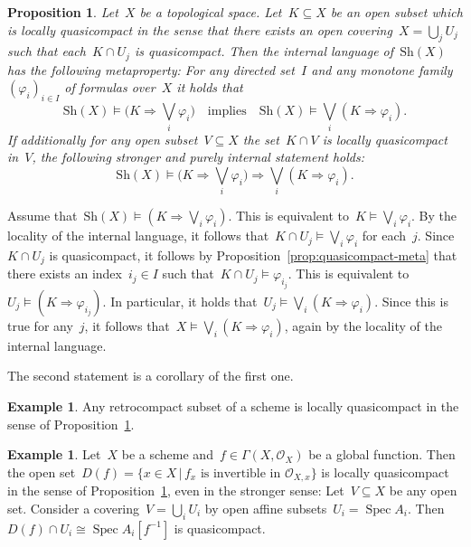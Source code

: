 \documentclass[10pt,reqno,a4paper]{amsbook}
\makeatletter
\theoremstyle{definition}
\newtheorem{ex}[defn]{Example}
\theoremstyle{plain}
\newtheorem{prop}[defn]{Proposition}
\theoremstyle{remark}
\renewcommand{\O}{\mathcal{O}}
\newcommand{\Sh}{\mathrm{Sh}}
\DeclareMathOperator{\Spec}{Spec}
\newcommand{\?}{\,{:}\,}
\renewcommand{\_}{\mathpunct{.}\,}
\renewenvironment{proof}[1][\proofname]{\par
  \pushQED{\qed}%
  \normalfont \topsep6\p@\@plus6\p@\relax
  \trivlist
  \item[\hskip\labelsep
        \itshape
    #1\@addpunct{.}]\ignorespaces
}{%
  \popQED\endtrivlist\@endpefalse
}
\makeatother
\begin{document}
\begin{prop}\label{prop:locally-qc}
Let~$X$ be a topological space. Let~$K \subseteq X$ be an open
subset which is \emph{locally quasicompact} in the sense that there exists an open
covering~$X = \bigcup_j U_j$ such that each~$K \cap U_j$ is quasicompact. Then the
internal language of~$\Sh(X)$ has the following metaproperty: For any
directed set~$I$ and any monotone family~$(\varphi_i)_{i \in I}$ of formulas
over~$X$ it holds that
\[ \Sh(X) \models \bigl(K \Rightarrow \bigvee_i \varphi_i\bigr)
  \quad\text{implies}\quad
  \Sh(X) \models \bigvee_i (K \Rightarrow \varphi_i). \]
If additionally for any open subset~$V \subseteq X$ the set~$K \cap V$ is
locally quasicompact in~$V\!$, the following stronger and purely internal
statement holds:
\[ \Sh(X) \models \bigl(K \Rightarrow \bigvee_i \varphi_i\bigr)
  \Longrightarrow
  \bigvee_i (K \Rightarrow \varphi_i). \]
\end{prop}
\begin{proof}Assume that~$\Sh(X) \models (K \Rightarrow \bigvee_i \varphi_i)$.
This is equivalent to~$K \models \bigvee_i \varphi_i$. By the locality of the
internal language, it follows that~$K \cap U_j \models \bigvee_i \varphi_i$ for each~$j$.
Since~$K \cap U_j$ is quasicompact, it follows by Proposition~\ref{prop:quasicompact-meta} that
there exists an index~$i_j \in I$ such that~$K \cap U_j \models \varphi_{i_j}$.
This is equivalent to~$U_j \models (K \Rightarrow \varphi_{i_j})$. In
particular, it holds that~$U_j \models \bigvee_i (K \Rightarrow \varphi_i)$.
Since this is true for any~$j$, it follows that~$X \models \bigvee_i (K
\Rightarrow \varphi_i)$, again by the locality of the internal language.

The second statement is a corollary of the first one.
\end{proof}

\begin{ex}Any retrocompact subset of a scheme is locally quasicompact in the
sense of Proposition~\ref{prop:locally-qc}.\end{ex}

\begin{ex}\label{ex:df-locally-compact}
Let~$X$ be a scheme and~$f \in \Gamma(X,\O_X)$ be a global function.
Then the open set~$D(f) = \{ x \in X \,|\, \text{$f_x$ is invertible in~$\O_{X,x}$}
\}$ is locally quasicompact in the sense of Proposition~\ref{prop:locally-qc}, even in the
stronger sense: Let~$V \subseteq X$ be any open set. Consider a covering~$V = \bigcup_i
U_i$ by open affine subsets~$U_i = \Spec A_i$. Then~$D(f) \cap U_i \cong \Spec
A_i[f^{-1}]$ is quasicompact.\end{ex}
\end{document}
